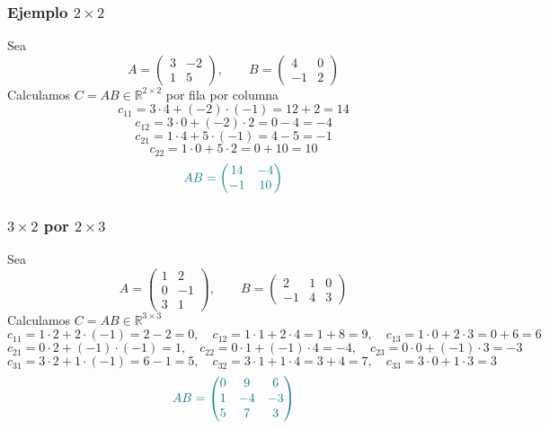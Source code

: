 \documentclass{article}
\begin{document}
\subsubsection*{Ejemplo \(2\times 2\)}
Sea
\[
A=\begin{pmatrix}
3 & -2\\
1 & 5
\end{pmatrix},
\qquad
B=\begin{pmatrix}
4 & 0\\
-1 & 2
\end{pmatrix}
\]
Calculamos \(C=AB\in\mathbb R^{2\times 2}\) por fila por columna
\[
c_{11}=3\cdot 4+(-2)\cdot(-1)=12+2=14
\]
\[
c_{12}=3\cdot 0+(-2)\cdot 2=0-4=-4
\]
\[
c_{21}=1\cdot 4+5\cdot(-1)=4-5=-1
\]
\[
c_{22}=1\cdot 0+5\cdot 2=0+10=10
\]
\[\color{teal}
AB=\begin{pmatrix}14&-4\\ -1&10\end{pmatrix}
\]

\subsubsection*{\(3\times 2\) por \(2\times 3\)}
Sea
\[
A=\begin{pmatrix}
1 & 2\\
0 & -1\\
3 & 1
\end{pmatrix},
\qquad
B=\begin{pmatrix}
2 & 1 & 0\\
-1 & 4 & 3
\end{pmatrix}
\]
Calculamos \(C=AB\in\mathbb R^{3\times 3}\)
\[
c_{11}=1\cdot 2+2\cdot(-1)=2-2=0,\quad
c_{12}=1\cdot 1+2\cdot 4=1+8=9,\quad
c_{13}=1\cdot 0+2\cdot 3=0+6=6
\]
\[
c_{21}=0\cdot 2+(-1)\cdot(-1)=1,\quad
c_{22}=0\cdot 1+(-1)\cdot 4=-4,\quad
c_{23}=0\cdot 0+(-1)\cdot 3=-3
\]
\[
c_{31}=3\cdot 2+1\cdot(-1)=6-1=5,\quad
c_{32}=3\cdot 1+1\cdot 4=3+4=7,\quad
c_{33}=3\cdot 0+1\cdot 3=3
\]
\[ \color{teal}
AB=\begin{pmatrix}
0 & 9 & 6\\
1 & -4 & -3\\
5 & 7 & 3
\end{pmatrix}
\]
\end{document}
